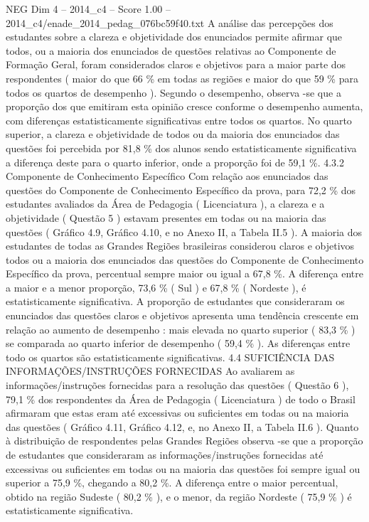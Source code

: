 \begin{textsample}{NEG Dim 4 – 2014\_c4 – Score 1.00 – 2014\_c4/enade\_2014\_pedag\_076bc59f40.txt}
A análise das percepções dos estudantes sobre a clareza e objetividade dos enunciados permite afirmar que todos, ou a maioria dos enunciados de questões relativas ao Componente de Formação Geral, foram considerados claros e objetivos para a maior parte dos respondentes ( maior do que 66 \% em todas as regiões e maior do que 59 \% para todos os quartos de desempenho ).
Segundo o desempenho, observa -se que a proporção dos que emitiram esta opinião cresce conforme o desempenho aumenta, com diferenças estatisticamente significativas entre todos os quartos.
No quarto superior, a clareza e objetividade de todos ou da maioria dos enunciados das questões foi percebida por 81,8 \% dos alunos sendo estatisticamente significativa a diferença deste para o quarto inferior, onde a proporção foi de 59,1 \%. 4.3.2 Componente de Conhecimento Específico Com relação aos enunciados das questões do Componente de Conhecimento Específico da prova, para 72,2 \% dos estudantes avaliados da Área de Pedagogia ( Licenciatura ), a clareza e a objetividade ( Questão 5 ) estavam presentes em todas ou na maioria das questões ( Gráfico 4.9, Gráfico 4.10, e no Anexo II, a Tabela II.5 ).
A maioria dos estudantes de todas as Grandes Regiões brasileiras considerou claros e objetivos todos ou a maioria dos enunciados das questões do Componente de Conhecimento Específico da prova, percentual sempre maior ou igual a 67,8 \%.
A diferença entre a maior e a menor proporção, 73,6 \% ( Sul ) e 67,8 \% ( Nordeste ), é estatisticamente significativa.
A proporção de estudantes que consideraram os enunciados das questões claros e objetivos apresenta uma tendência crescente em relação ao aumento de desempenho : mais elevada no quarto superior ( 83,3 \% ) se comparada ao quarto inferior de desempenho ( 59,4 \% ).
As diferenças entre todo os quartos são estatisticamente significativas. 4.4 SUFICIÊNCIA DAS INFORMAÇÕES/INSTRUÇÕES FORNECIDAS Ao avaliarem as informações/instruções fornecidas para a resolução das questões ( Questão 6 ), 79,1 \% dos respondentes da Área de Pedagogia ( Licenciatura ) de todo o Brasil afirmaram que estas eram até excessivas ou suficientes em todas ou na maioria das questões ( Gráfico 4.11, Gráfico 4.12, e, no Anexo II, a Tabela II.6 ).
Quanto à distribuição de respondentes pelas Grandes Regiões observa -se que a proporção de estudantes que consideraram as informações/instruções fornecidas até excessivas ou suficientes em todas ou na maioria das questões foi sempre igual ou superior a 75,9 \%, chegando a 80,2 \%.
A diferença entre o maior percentual, obtido na região Sudeste ( 80,2 \% ), e o menor, da região Nordeste ( 75,9 \% ) é estatisticamente significativa.

\end{textsample}
